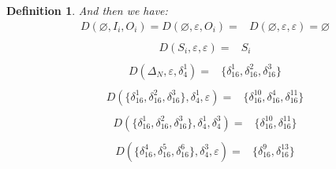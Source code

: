 \documentclass[conference]{IEEEtran} %
\newtheorem{definition}{Definition}
\begin{document}
\begin{definition}
And then we have:
\begin{equation}
\begin{split}
D\left(\varnothing,I_i,O_i\right)=D\left(\varnothing,\varepsilon,O_i\right)=&D\left(\varnothing,\varepsilon,\varepsilon\right)=\varnothing\\
\end{split}
\label{equ:7}
\end{equation}
\begin{equation}
\begin{split}
D\left(S_i,\varepsilon,\varepsilon\right)=&S_i\\
\end{split}
\label{equ:8}
\end{equation}
\begin{equation}
\begin{split}
D\left(\Delta_N,\varepsilon,\delta_4^1\right)=&\{\delta_{16}^1,\delta_{16}^2,\delta_{16}^3\}\\
\end{split}
\label{equ:9}
\end{equation}
\begin{equation}
\begin{split}
D\left(\{\delta_{16}^1,\delta_{16}^2,\delta_{16}^3\},\delta_4^1,\varepsilon\right)=&\{\delta_{16}^{10},\delta_{16}^4,\delta_{16}^{11}\}\\
\end{split}
\label{equ:10}
\end{equation}
\begin{equation}
\begin{split}
D\left(\{\delta_{16}^1,\delta_{16}^2,\delta_{16}^3\},\delta_4^1,\delta_4^3\right)=&\{\delta_{16}^{10},\delta_{16}^{11}\}\\
\end{split}
\label{equ:11}
\end{equation}
\begin{equation}
\begin{split}
D\left(\{\delta_{16}^4,\delta_{16}^5,\delta_{16}^6\},\delta_4^3,\varepsilon\right)=&\{\delta_{16}^9,\delta_{16}^{13}\}
\end{split}
\label{equ:12}
\end{equation}

\end{definition}
\end{document}
